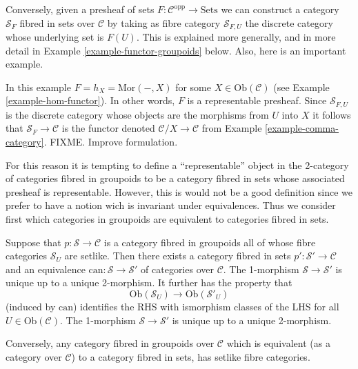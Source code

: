 \smallskip\noindent
Conversely, given a presheaf of sets
$F : \mathcal{C}^{\text{opp}} \to \text{Sets}$
we can construct a category $\mathcal{S}_F$ fibred in sets
over $\mathcal{C}$ by taking as fibre category $\mathcal{S}_{F,U}$ 
the discrete category whose underlying set is $F(U)$. This is explained
more generally, and in more detail in Example \ref{example-functor-groupoids}
below. Also, here is an important example.

\begin{example}
\label{example-fibred-category-from-functor-of-points}
In this example $F = h_X = \text{Mor}(-,X)$ for some
$X \in \text{Ob}(\mathcal{C})$ (see Example \ref{example-hom-functor}).
In other words, $F$ is a representable presheaf.
Since $\mathcal{S}_{F,U}$ is the discrete category whose objects are the
morphisms from $U$ into $X$ it follows that
$\mathcal{S}_F\to \mathcal{C}$ is the functor denoted
$\mathcal{C}/X \to \mathcal{C}$ from
Example \ref{example-comma-category}.
FIXME. Improve formulation.
\end{example}

\smallskip\noindent
For this reason it is tempting to define a ``representable'' object in the
2-category of categories fibred in groupoids to be a category fibred in
sets whose associated presheaf is representable. However, this is would not
be a good definition since we prefer to have a notion wich is invariant under
equivalences. Thus we consider first which categories in groupoids are
equivalent to categories fibred in sets.

\begin{lemma}
\label{lemma-setlike-fibres}
Suppose that $p : \mathcal{S} \to \mathcal{C}$ is a category fibred in
groupoids all of whose fibre categories $\mathcal{S}_U$ are setlike. 
Then there exists a category fibred in sets $p' : \mathcal{S}' \to
\mathcal{C}$ and an equivalence
$\text{can}:\mathcal{S} \to \mathcal{S}'$ of categories over $\mathcal{C}$.
The 1-morphism $\mathcal{S}\to\mathcal{S}'$ is unique up to a unique
2-morphism. It further has the property that
$$
\text{Ob}(\mathcal{S}_U) \longrightarrow \text{Ob}(\mathcal{S}'_U) 
$$
(induced by $\text{can}$) identifies the RHS with ismorphism classes of the
LHS for all $U \in \text{Ob}(\mathcal{C})$. The 1-morphism
$\mathcal{S}\to\mathcal{S}'$ is unique up to a unique 2-morphism. 

\smallskip\noindent
Conversely, any category fibred in groupoids over $\mathcal{C}$ which
is equivalent (as a category over $\mathcal{C}$) to a category fibred 
in sets, has setlike fibre categories.
\end{lemma}

